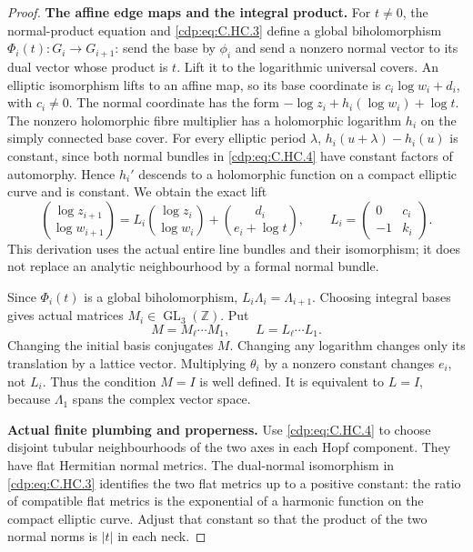 \begin{proof}
\par\medskip\noindent\textbf{The affine edge maps and the integral product.}
For $t\ne0$, the normal-product equation and
\eqref{cdp:eq:C.HC.3} define a global biholomorphism
$\Phi_i(t):G_i\to G_{i+1}$: send the base by $\phi_i$
and send a nonzero normal vector to its dual vector
whose product is $t$. Lift it to the logarithmic
universal covers. An elliptic isomorphism lifts to
an affine map, so its base coordinate is
$c_i\log w_i+d_i$, with $c_i\ne0$.
The normal coordinate has the form
$-\log z_i+h_i(\log w_i)+\log t$.
The nonzero holomorphic fibre multiplier has a
holomorphic logarithm $h_i$ on the simply connected
base cover. For every elliptic period $\lambda$,
$h_i(u+\lambda)-h_i(u)$ is constant, since both
normal bundles in \eqref{cdp:eq:C.HC.4} have constant factors of
automorphy. Hence $h_i'$ descends to a holomorphic
function on a compact elliptic curve and is constant.
We obtain the exact lift
\[
 \binom{\log z_{i+1}}{\log w_{i+1}}
 =
 L_i\binom{\log z_i}{\log w_i}
 +\binom{d_i}{e_i+\log t},
 \qquad
 L_i=\begin{pmatrix}0&c_i\\-1&k_i\end{pmatrix}.
\tag{C.HC.5}\label{cdp:eq:C.HC.5}
\]
This derivation uses the actual entire line bundles
and their isomorphism; it does not replace an
analytic neighbourhood by a formal normal bundle.

Since $\Phi_i(t)$ is a global biholomorphism,
$L_i\Lambda_i=\Lambda_{i+1}$. Choosing integral bases
gives actual matrices $M_i\in\operatorname{GL}_3(\mathbb Z)$.
Put
\[
 M=M_\ell\cdots M_1,\qquad L=L_\ell\cdots L_1.
\tag{C.HC.6}\label{cdp:eq:C.HC.6}
\]
Changing the initial basis conjugates $M$.
Changing any logarithm changes only its translation
by a lattice vector. Multiplying $\theta_i$ by a
nonzero constant changes $e_i$, not $L_i$.
Thus the condition $M=I$ is well defined.
It is equivalent to $L=I$, because $\Lambda_1$
spans the complex vector space.

\par\medskip\noindent\textbf{Actual finite plumbing and properness.}
Use \eqref{cdp:eq:C.HC.4} to choose disjoint tubular neighbourhoods
of the two axes in each Hopf component. They have
flat Hermitian normal metrics. The dual-normal
isomorphism in \eqref{cdp:eq:C.HC.3} identifies the two flat
metrics up to a positive constant: the ratio of
compatible flat metrics is the exponential of a
harmonic function on the compact elliptic curve.
Adjust that constant so that the product of the
two normal norms is $|t|$ in each neck.


\end{proof}
